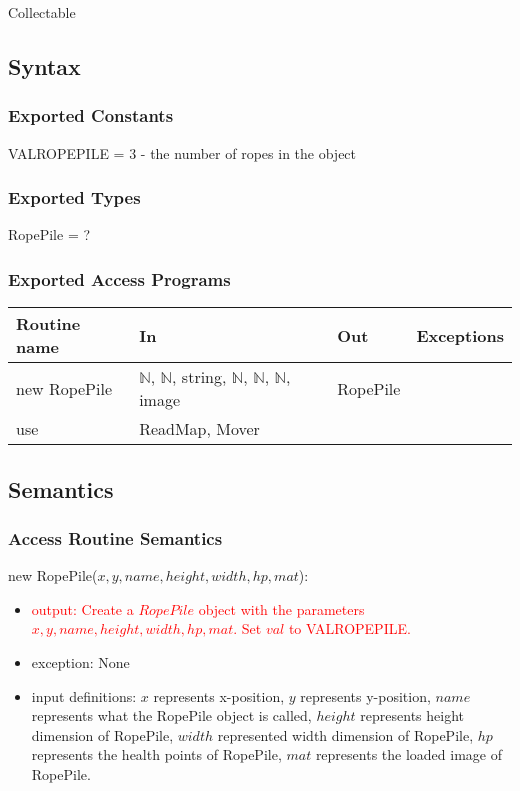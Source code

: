 \documentclass[12pt]{article}
\newcommand{\m}[1]{\mbox{#1}}
\begin{document}
Collectable

\subsection*{Syntax}

\subsubsection*{Exported Constants}

VALROPEPILE = $3$ - the number of ropes in the object

\subsubsection*{Exported Types}

RopePile = ?

\subsubsection*{Exported Access Programs}

\begin{tabular}{| l | l | l | l |}
\hline
\textbf{Routine name} & \textbf{In} & \textbf{Out} & \textbf{Exceptions}\\
\hline
new RopePile & $\mathbb{N}$, $\mathbb{N}$, string, $\mathbb{N}$, $\mathbb{N}$, $\mathbb{N}$, image & RopePile & ~\\
\hline
use & ReadMap, Mover & ~ & ~\\
\hline
\end{tabular}

\subsection*{Semantics}

\subsubsection*{Access Routine Semantics}

new RopePile($x, y, name, height, width, hp, mat$):
\begin{itemize}
    \item \textcolor{red}{output: Create a $RopePile$ object with the parameters $x, y, name, height, width, hp, mat$. Set $val$ to VALROPEPILE.}
    \item exception: None
    \item input definitions: $x$ represents x-position, $y$ represents y-position, $name$ represents what the RopePile object is called, $height$ represents height dimension of RopePile, $width$ represented width dimension of RopePile, $hp$ represents the health points of RopePile, $mat$ represents the loaded image of RopePile.
\end{itemize}
\end{document}
